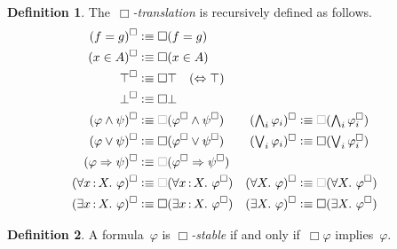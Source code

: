 \documentclass[10pt,reqno,a4paper]{amsbook}
\theoremstyle{definition}
\newtheorem{defn}{Definition}[section]
\theoremstyle{plain}
\theoremstyle{remark}
\newcommand{\?}{\,{:}\,}
\renewcommand{\_}{\mathpunct{.}\,}
\newcommand{\defequiv}{\vcentcolon\equiv}
\begin{document}
\begin{defn}The~\emph{$\Box$-translation} is recursively defined as follows.
\newcommand{\optBox}{\textcolor{gray}{\Box}}
\begin{align*}
  (f = g)^\Box &\defequiv \Box(f = g) \\
  (x \in A)^\Box &\defequiv \Box(x \in A) \\
  \top^\Box &\defequiv \Box\top \quad \text{($\Leftrightarrow \top$)} \\
  \bot^\Box &\defequiv \Box\bot \\
  (\varphi \wedge \psi)^\Box &\defequiv \optBox(\varphi^\Box \wedge \psi^\Box) &
  \textstyle (\bigwedge_i \varphi_i)^\Box &\defequiv \textstyle \optBox(\bigwedge_i \varphi_i^\Box) \\
  (\varphi \vee \psi)^\Box &\defequiv \Box(\varphi^\Box \vee \psi^\Box) &
  \textstyle (\bigvee_i \varphi_i)^\Box &\defequiv \textstyle \Box(\bigvee_i \varphi_i^\Box) \\
  (\varphi \Rightarrow \psi)^\Box &\defequiv \optBox(\varphi^\Box \Rightarrow \psi^\Box) \\
  (\forall x\?X\_ \varphi)^\Box &\defequiv \optBox(\forall x\?X\_ \varphi^\Box) &
  (\forall X\_ \varphi)^\Box &\defequiv \optBox(\forall X\_ \varphi^\Box) \\
  (\exists x\?X\_ \varphi)^\Box &\defequiv \Box(\exists x\?X\_ \varphi^\Box) &
  (\exists X\_ \varphi)^\Box &\defequiv \Box(\exists X\_ \varphi^\Box)
\end{align*}
\end{defn}

\begin{defn}A formula~$\varphi$ is \emph{$\Box$-stable} if and only
if~$\Box\varphi$ implies~$\varphi$.\end{defn}
\end{document}
